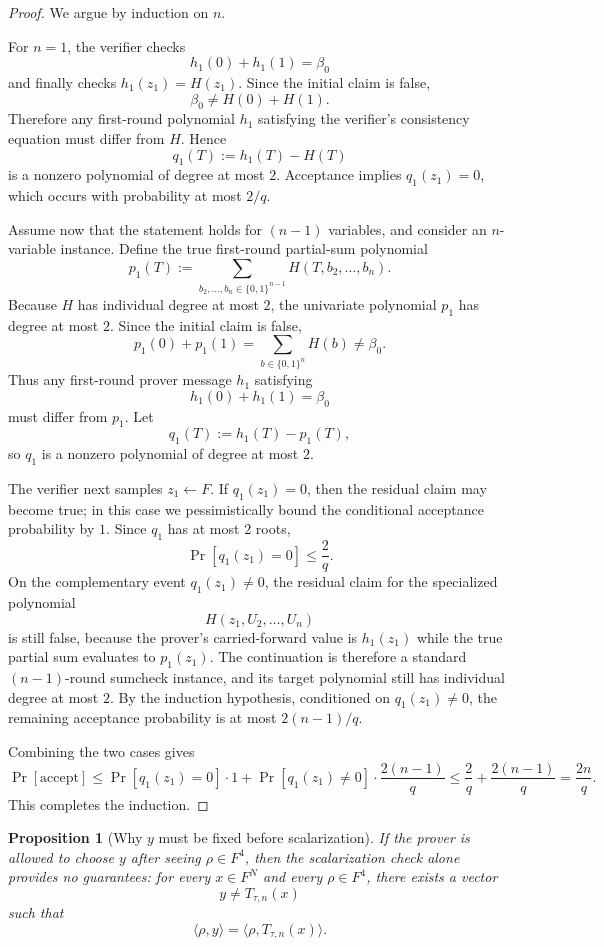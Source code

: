 \documentclass[11pt]{article}
\newtheorem{proposition}[theorem]{Proposition}
\begin{document}
\begin{proof}
We argue by induction on $n$.

For $n=1$, the verifier checks
\[
h_1(0)+h_1(1)=\beta_0
\]
and finally checks $h_1(z_1)=H(z_1)$. Since the initial claim is false,
\[
\beta_0\neq H(0)+H(1).
\]
Therefore any first-round polynomial $h_1$ satisfying the verifier's consistency equation must differ from $H$. Hence
\[
q_1(T):=h_1(T)-H(T)
\]
is a nonzero polynomial of degree at most $2$. Acceptance implies $q_1(z_1)=0$, which occurs with probability at most $2/q$.

Assume now that the statement holds for $(n-1)$ variables, and consider an $n$-variable instance. Define the true first-round partial-sum polynomial
\[
p_1(T):=\sum_{b_2,\dots,b_n\in\{0,1\}^{n-1}} H(T,b_2,\dots,b_n).
\]
Because $H$ has individual degree at most $2$, the univariate polynomial $p_1$ has degree at most $2$. Since the initial claim is false,
\[
p_1(0)+p_1(1)=\sum_{b\in\{0,1\}^n} H(b)\neq\beta_0.
\]
Thus any first-round prover message $h_1$ satisfying
\[
h_1(0)+h_1(1)=\beta_0
\]
must differ from $p_1$. Let
\[
q_1(T):=h_1(T)-p_1(T),
\]
so $q_1$ is a nonzero polynomial of degree at most $2$.

The verifier next samples $z_1\leftarrow F$. If $q_1(z_1)=0$, then the residual claim may become true; in this case we pessimistically bound the conditional acceptance probability by $1$. Since $q_1$ has at most $2$ roots,
\[
\Pr[q_1(z_1)=0]\le \frac{2}{q}.
\]
On the complementary event $q_1(z_1)\neq 0$, the residual claim for the specialized polynomial
\[
H(z_1,U_2,\dots,U_n)
\]
is still false, because the prover's carried-forward value is $h_1(z_1)$ while the true partial sum evaluates to $p_1(z_1)$. The continuation is therefore a standard $(n-1)$-round sumcheck instance, and its target polynomial still has individual degree at most $2$. By the induction hypothesis, conditioned on $q_1(z_1)\neq 0$, the remaining acceptance probability is at most $2(n-1)/q$.

Combining the two cases gives
\[
\Pr[\text{accept}]
\le
\Pr[q_1(z_1)=0]\cdot 1
+
\Pr[q_1(z_1)\neq 0]\cdot \frac{2(n-1)}{q}
\le
\frac{2}{q}+\frac{2(n-1)}{q}
=
\frac{2n}{q}.
\]
This completes the induction.
\end{proof}

\begin{proposition}[Why $y$ must be fixed before scalarization]
\label{prop:it-pre-rho-needed}
If the prover is allowed to choose $y$ after seeing $\rho\in F^4$, then the scalarization check alone provides no guarantees: for every $x\in F^N$ and every $\rho\in F^4$, there exists a vector
\[
y\neq T_{\tau,n}(x)
\]
such that
\[
\langle \rho,y\rangle=\langle \rho,T_{\tau,n}(x)\rangle.
\]
\end{proposition}
\end{document}

